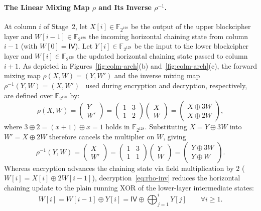 \documentclass[11pt,a4paper]{article}
\theoremstyle{definition}
\theoremstyle{remark}
\newcommand{\FtwoN}{\mathbb{F}_{2^{128}}}
\newcommand{\IV}{\mathsf{IV}}
\begin{document}
\paragraph{The Linear Mixing Map $\rho$ and Its Inverse $\rho^{-1}$.}
At column $i$ of Stage~2, let $X[i] \in \FtwoN$ be the output of the upper blockcipher layer and $W[i-1] \in \FtwoN$ the incoming horizontal chaining state from column $i-1$ (with $W[0] = \IV$). Let $Y[i] \in \FtwoN$ be the input to the lower blockcipher layer and $W[i] \in \FtwoN$ the updated horizontal chaining state passed to column $i+1$. As depicted in Figures~\ref{fig:colm-arch}(b) and~\ref{fig:colm-arch}(c), the forward mixing map $\rho(X, W) = (Y, W')$ and the inverse mixing map $\rho^{-1}(Y, W) = (X, W')$~\cite[Section~1.3, p.~3]{COLMv1} used during encryption and decryption, respectively, are defined over $\FtwoN$ by:
\begin{equation}
\label{eq:rho}
\rho(X, W) = \begin{pmatrix} Y \\ W' \end{pmatrix} = \begin{pmatrix} 1 & 3 \\ 1 & 2 \end{pmatrix} \begin{pmatrix} X \\ W \end{pmatrix} = \begin{pmatrix} X \oplus 3W \\ X \oplus 2W \end{pmatrix},
\end{equation}
where $3 \oplus 2 = (x + 1) \oplus x = 1$ holds in $\FtwoN$. Substituting $X = Y \oplus 3W$ into $W' = X \oplus 2W$ therefore cancels the multiplier on $W$, giving
\begin{equation}
\label{eq:rho-inv}
\rho^{-1}(Y, W) = \begin{pmatrix} X \\ W' \end{pmatrix} = \begin{pmatrix} 1 & 3 \\ 1 & 1 \end{pmatrix} \begin{pmatrix} Y \\ W \end{pmatrix} = \begin{pmatrix} Y \oplus 3W \\ Y \oplus W \end{pmatrix}.
\end{equation}
Whereas encryption advances the chaining state via field multiplication by $2$ ($W[i] = X[i] \oplus 2W[i-1]$), decryption~\eqref{eq:rho-inv} reduces the horizontal chaining update to the plain running XOR of the lower-layer intermediate states:
\begin{equation}
\label{eq:W-running-xor}
W[i] = W[i-1] \oplus Y[i] = \IV \oplus \bigoplus_{j=1}^{i} Y[j] \qquad \forall i \ge 1.
\end{equation}
\end{document}
